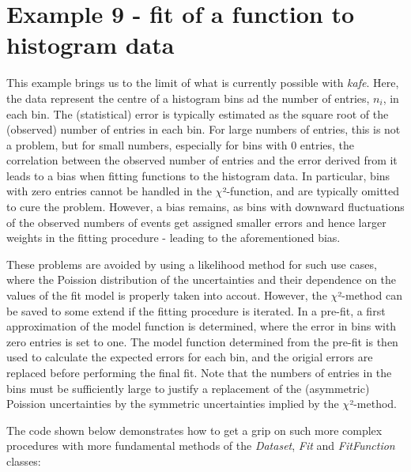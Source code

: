 \documentclass[a4paper,10pt,english]{sphinxmanual}
\begin{document}
\section{Example 9 - fit of a function to histogram data}
\label{index:example-9-fit-of-a-function-to-histogram-data}
This example brings us to the limit of what is currently
possible with \emph{kafe}. Here, the data represent the
centre of a histogram bins ad the number of entries, $n_i$,
in each bin. The (statistical) error is typically estimated
as the square root of the (observed) number of entries in each bin.
For large numbers of entries, this is not a problem,
but for small numbers, especially for bins with 0 entries,
the correlation between the observed number of entries and
the error derived from it leads to a bias when fitting
functions to the histogram data. In particular, bins with
zero entries cannot be handled in the \(\chi\)²-function, and are
typically omitted to cure the problem.  However, a bias
remains, as bins with downward fluctuations of the
observed numbers of events get assigned smaller errors
and hence larger weights in the fitting procedure - leading
to the aforementioned bias.

These problems are avoided by using a likelihood method for
such use cases, where the Poission distribution of the uncertainties
and their dependence on the values of the fit model is properly
taken into accout. However, the \(\chi\)²-method can be saved to some
extend if the fitting procedure is iterated. In a pre-fit, a
first approximation of the model function is determined, where
the error in bins with zero entries is set to one. The model
function determined from the pre-fit is then used to calculate
the expected errors for each bin, and the origial errors are
replaced before performing the final fit. Note that the numbers
of entries in the bins must be sufficiently large to justify
a replacement of the (asymmetric) Poission uncertainties by
the symmetric uncertainties implied by the \(\chi\)²-method.

The code shown below demonstrates
how to get a grip on such more complex procedures with
more fundamental methods of the \emph{Dataset}, \emph{Fit} and
\emph{FitFunction} classes:
\end{document}
